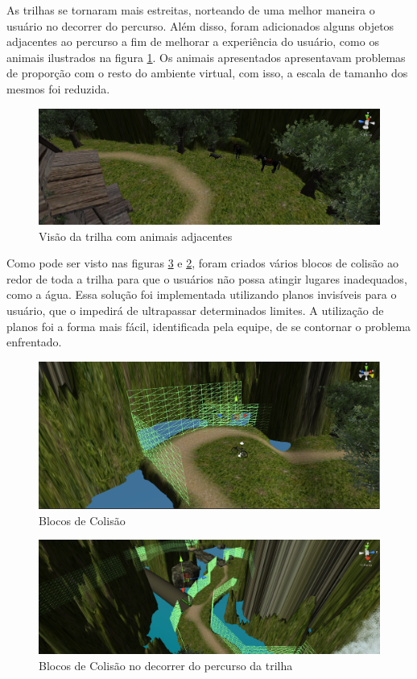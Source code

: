 As trilhas se tornaram mais estreitas, norteando de uma melhor maneira o usuário no decorrer do percurso. Além disso, foram adicionados alguns objetos adjacentes ao percurso a fim de melhorar a experiência do usuário, como os animais ilustrados na figura \ref{fig:animaisPista}. Os animais apresentados apresentavam problemas de proporção com o resto do ambiente virtual, com isso, a escala de tamanho dos mesmos foi reduzida.

\begin{figure}[h]
  \centering
  \includegraphics[width=1.0\textwidth]{figuras/animaisPista}
  \caption{Visão da trilha com animais adjacentes}
  \label{fig:animaisPista}
\end{figure}

Como pode ser visto nas figuras \ref{fig:blocosPercurso} e \ref{fig:blocosColisao}, foram criados vários blocos de colisão ao redor de toda a trilha para que o usuários não possa atingir lugares inadequados, como a água. Essa solução foi implementada utilizando planos invisíveis para o usuário, que o impedirá de ultrapassar determinados limites. A utilização de planos foi a forma mais fácil, identificada pela equipe, de se contornar o problema enfrentado.

\begin{figure}[h]
  \centering
  \includegraphics[width=1.0\textwidth]{figuras/blocosColisao}
  \caption{Blocos de Colisão}
  \label{fig:blocosColisao}
\end{figure}

\begin{figure}[h]
  \centering
  \includegraphics[width=1.0\textwidth]{figuras/blocosPercurso}
  \caption{Blocos de Colisão no decorrer do percurso da trilha}
  \label{fig:blocosPercurso}
\end{figure}

